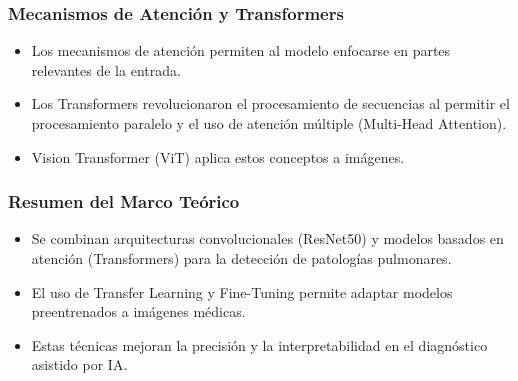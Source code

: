 \begin{frame}
\frametitle{Mecanismos de Atención y Transformers}
\begin{itemize}
    \item Los mecanismos de atención permiten al modelo enfocarse en partes relevantes de la entrada.
    \item Los Transformers revolucionaron el procesamiento de secuencias al permitir el procesamiento paralelo y el uso de atención múltiple (Multi-Head Attention).
    \item Vision Transformer (ViT) aplica estos conceptos a imágenes.
\end{itemize}
\end{frame}

\begin{frame}
\frametitle{Resumen del Marco Teórico}
\begin{itemize}
    \item Se combinan arquitecturas convolucionales (ResNet50) y modelos basados en atención (Transformers) para la detección de patologías pulmonares.
    \item El uso de Transfer Learning y Fine-Tuning permite adaptar modelos preentrenados a imágenes médicas.
    \item Estas técnicas mejoran la precisión y la interpretabilidad en el diagnóstico asistido por IA.
\end{itemize}
\end{frame}
